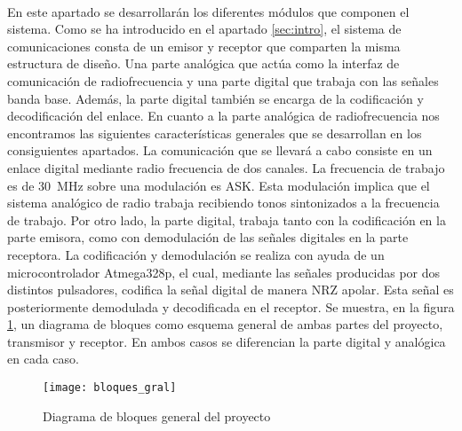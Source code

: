 \paragraph{}
En este apartado se desarrollar\'an los diferentes módulos que componen el sistema.
Como se ha introducido en el apartado \ref{sec:intro}, el sistema de comunicaciones consta de un emisor y receptor que comparten la misma estructura de diseño. 
Una parte analógica que actúa como la interfaz de comunicación de radiofrecuencia y una parte digital que trabaja con las señales banda base. Además, la parte digital también se encarga de la codificación y decodificación del enlace.
En cuanto a la parte analógica de radiofrecuencia nos encontramos las siguientes características generales que se desarrollan en los consiguientes apartados. 
La comunicaci\'on que se llevará a cabo consiste en un enlace digital mediante radio frecuencia de dos canales.
La frecuencia de trabajo es de \SI{30}{\mega\hertz} sobre una modulación es ASK.
Esta modulación implica que el sistema analógico de radio trabaja recibiendo tonos sintonizados a la frecuencia de trabajo.
Por otro lado, la parte digital, trabaja tanto con
la codificación en la parte emisora, como con demodulación de las señales digitales en la parte receptora. 
La codificación y demodulación se realiza con ayuda de un microcontrolador Atmega328p, el cual, mediante las señales producidas por dos distintos pulsadores, codifica la señal digital de manera NRZ apolar.
Esta señal es posteriormente demodulada y decodificada en el receptor.
Se muestra, en la figura \ref{fig:bloques_gral}, un diagrama de bloques como esquema general de ambas partes del proyecto, transmisor y receptor. En ambos casos se diferencian la parte digital y anal\'ogica en cada caso.

\begin{figure}[h]
    \centering
    \texttt{[image: bloques\_gral]}
    \caption{Diagrama de bloques general del proyecto}
    \label{fig:bloques_gral}
\end{figure}
